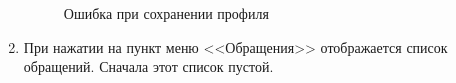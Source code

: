 \documentclass{../includes/TechDoc}
\begin{document}
\begin{enumerate}
\begin{figure}[h]
\begin{center}
\begin{minipage}[h]{0.49\linewidth}
                    \caption{Ошибка при сохранении профиля}
                    \label{ris:profile_error}
                \end{minipage}
            \end{center}
        \end{figure}

        \item При нажатии на пункт меню <<Обращения>> отображается список обращений.
        Сначала этот список пустой.


\end{enumerate}
\end{document}
